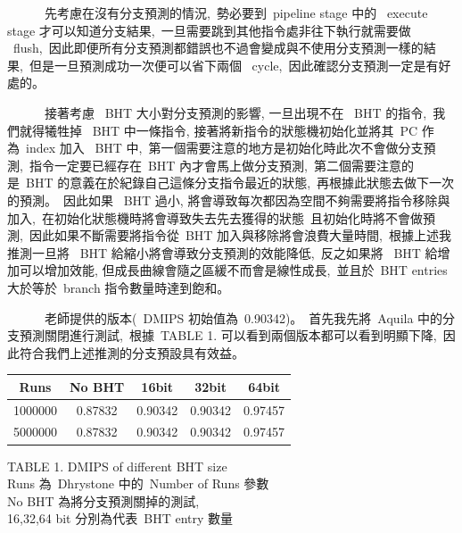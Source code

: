 \documentclass{article}
\begin{document}
\begin{CJK*}{UTF8}{bsmi}
\begin{multicols}{2}
\begin{flushleft}
    \ \ \ \ \ \ 先考慮在沒有分支預測的情況,\
    勢必要到\ pipeline stage 中的 \ execute stage 才可以知道分支結果,\
    一旦需要跳到其他指令處非往下執行就需要做 \ flush,\
    因此即便所有分支預測都錯誤也不過會變成與不使用分支預測一樣的結果,\
    但是一旦預測成功一次便可以省下兩個 \ cycle,\
    因此確認分支預測一定是有好處的。\newline

    \ \ \ \ \ \ 接著考慮 \ BHT 大小對分支預測的影響, 一旦出現不在 \ BHT 的指令,\
    我們就得犧牲掉 \ BHT 中一條指令, 接著將新指令的狀態機初始化並將其\ PC 作為\ index 加入 \ BHT 中,\
    第一個需要注意的地方是初始化時此次不會做分支預測,\
    指令一定要已經存在\ BHT 內才會馬上做分支預測,\
    第二個需要注意的是\ BHT 的意義在於紀錄自己這條分支指令最近的狀態,\
    再根據此狀態去做下一次的預測。\
    因此如果 \ BHT 過小, 將會導致每次都因為空間不夠需要將指令移除與加入,\
    在初始化狀態機時將會導致失去先去獲得的狀態\
    且初始化時將不會做預測,\
    因此如果不斷需要將指令從\ BHT 加入與移除將會浪費大量時間,\
    根據上述我推測一旦將 \ BHT 給縮小將會導致分支預測的效能降低,\ 
    反之如果將 \ BHT 給增加可以增加效能, 但成長曲線會隨之區緩不而會是線性成長,\
    並且於\ BHT entries 大於等於\ branch 指令數量時達到飽和。
    
\end{flushleft}

\begin{flushleft}
    \ \ \ \ \ \ 老師提供的版本(\ DMIPS 初始值為\ 0.90342)。\
    首先我先將\ Aquila 中的分支預測關閉進行測試,\
    根據\ TABLE 1. 可以看到兩個版本都可以看到明顯下降,\
    因此符合我們上述推測的分支預設具有效益。
\end{flushleft}

\begin{center}
    \begin{tabular}{||c c c c c ||} 
     \hline
     Runs & No BHT & 16bit & 32bit & 64bit \\ [2ex] 
     \hline\hline
     1000000 & 0.87832 & 0.90342 & 0.90342 & 0.97457 \\ 
     \hline
     5000000 & 0.87832 & 0.90342 & 0.90342 & 0.97457 \\ 
     \hline
    \end{tabular}
\end{center}

\begin{center}
    \small{TABLE 1. DMIPS of different BHT size}\\
    \footnotesize{Runs 為\ Dhrystone 中的\ Number of Runs 參數}\\
    \footnotesize{No BHT 為將分支預測關掉的測試,} \\
    \footnotesize{16,32,64 bit 分別為代表\ BHT entry 數量}
\end{center}



\end{multicols}
\end{CJK*}
\end{document}
